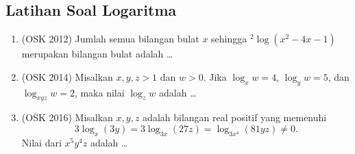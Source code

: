 \subsection{Latihan Soal Logaritma}
\begin{enumerate}  
    \item (OSK 2012) Jumlah semua bilangan bulat $x$ sehingga $^2 \log (x^2-4x-1)$ merupakan bilangan bulat adalah \dots
    
    \item (OSK 2014) Misalkan $x,y,z>1$ dan $w>0$. Jika $\log_x w = 4$, $\log_y w = 5$, dan $\log_{xyz} w = 2$, maka nilai $\log_z w$ adalah \dots 

    \item (OSK 2016) Misalkan $x,y,z$ adalah bilangan real positif yang memenuhi $$3 \log_x (3y) = 3 \log_{3x} (27z) = \log_{3x^4} (81yz) \neq 0.$$ Nilai dari $x^5y^4z$ adalah \dots
\end{enumerate}